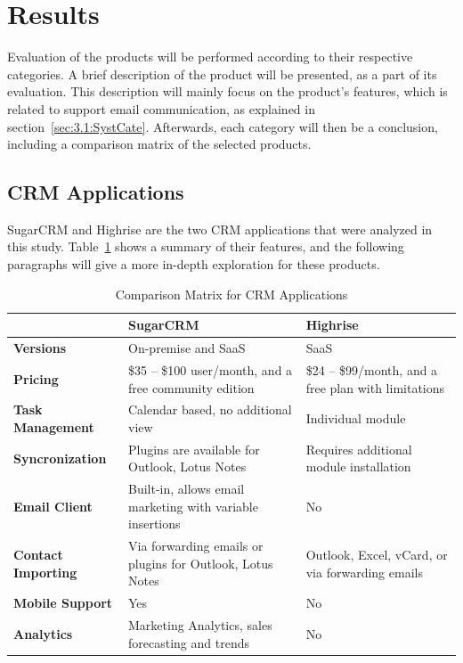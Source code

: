 \section{Results}
\label{sec:3.3:Resul}
Evaluation of the products will be performed according to their respective categories. A brief description of the product will be presented, as a part of its evaluation. This description will mainly focus on the product's features, which is related to support email communication, as explained in section~\ref{sec:3.1:SystCate}. Afterwards, each category will then be a conclusion, including a comparison matrix of the selected products.

\subsection{CRM Applications}
\label{subsec:3.3.1:CRMAppl}

SugarCRM and Highrise are the two \ac{CRM} applications that were analyzed in this study. Table~\ref{tab:comp_matr_crm} shows a summary of their features, and the following paragraphs will give a more in-depth exploration for these products.

\clearpage

\begin{table}[H]
\begin{center}
	\caption[Comparison Matrix for CRM Applications]{Comparison Matrix for CRM Applications} \label{tab:comp_matr_crm}
    \begin{tabular}{ | p{3cm} | p{5cm} | p{5cm} | }
	\hline
	& \textbf{SugarCRM} & \textbf{Highrise} \\ \hline
	\textbf{Versions} & On-premise and SaaS & SaaS \\ \hline
	\textbf{Pricing} & \$35 -- \$100 user/month, and a free community edition & \$24 -- \$99/month, and a free plan with limitations \\ \hline
	\textbf{Task Management} & Calendar based, no additional view & Individual module \\ \hline
	\textbf{Syncronization} & Plugins are available for Outlook, Lotus Notes & Requires additional module installation \\ \hline
	\textbf{Email Client} & Built-in, allows email marketing with variable insertions & No \\ \hline
	\textbf{Contact Importing} & Via forwarding emails or plugins for Outlook, Lotus Notes & Outlook, Excel, vCard, or via forwarding emails \\ \hline
	\textbf{Mobile Support} & Yes & No \\ \hline
	\textbf{Analytics} & Marketing Analytics, sales forecasting and trends & No \\ \hline
    \end{tabular}
\end{center}
\end{table}

